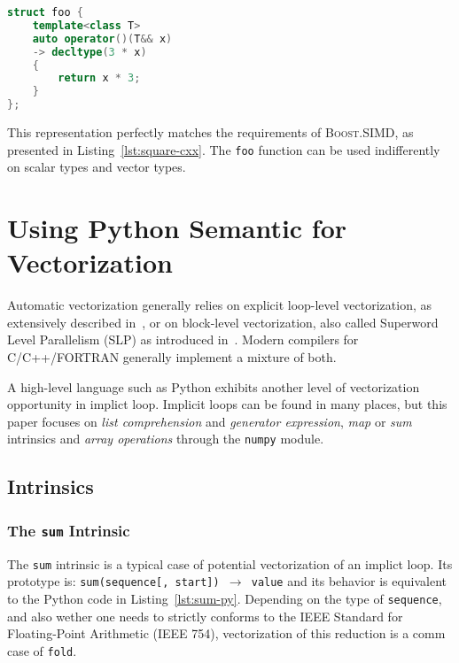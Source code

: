 \documentclass[preprint]{sigplanconf}
\providecommand{\boostsimd}{\textsc{Boost.SIMD}}
\begin{document}
\begin{lstlisting}[language=c++, caption={Simplified Pythran Translation of a Polymorphic Function}, label={lst:simple-pythran-output}]
struct foo {
    template<class T>
    auto operator()(T&& x)
    -> decltype(3 * x)
    {
        return x * 3;
    }
};
\end{lstlisting}

This representation perfectly matches the requirements of \boostsimd, as
presented in Listing~\ref{lst:square-cxx}. The \texttt{foo} function can be
used indifferently on scalar types and vector types.


\section{Using Python Semantic for Vectorization}
\label{sec:python-semantic}

Automatic vectorization generally relies on explicit loop-level vectorization, as
extensively described in~\cite{bik04}, or on block-level vectorization, also
called Superword Level Parallelism (SLP) as introduced in~\cite{larsen00}.
Modern compilers for C/C++/FORTRAN generally implement a mixture of both.

A high-level language such as Python exhibits another level of vectorization
opportunity in implict loop. Implicit loops can be found in many places, but
this paper focuses on \emph{list comprehension} and \emph{generator
expression}, \emph{map} or \emph{sum} intrinsics and \emph{array operations}
through the \texttt{numpy} module.

\subsection{Intrinsics}

\subsubsection{The \texttt{sum} Intrinsic}

The \texttt{sum} intrinsic is a typical case of potential vectorization of an
implict loop. Its prototype is: \texttt{sum(sequence[, start]) $\rightarrow$
value} and its behavior is equivalent to the Python code in
Listing~\ref{lst:sum-py}. Depending on the type of \texttt{sequence}, and also
wether one needs to strictly conforms to the IEEE Standard for Floating-Point
Arithmetic (IEEE 754), vectorization of this reduction is a comm case of \texttt{fold}.
\end{document}
